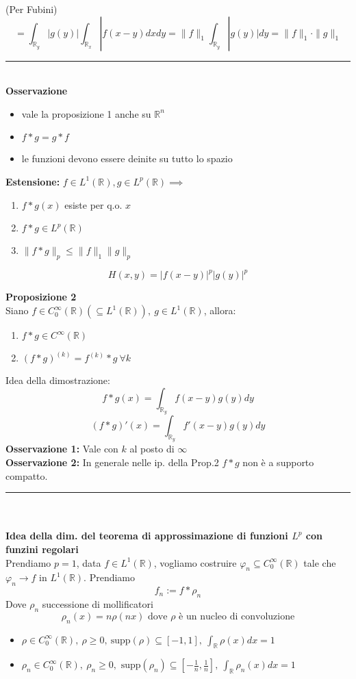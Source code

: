 \documentclass[a4paper]{article}
\newcommand{\R}{\mathbb{R}}
\newcommand{\divider}{\noindent\rule{\textwidth}{0.5pt}}
\begin{document}
(Per Fubini)
\[=\int_{\R_y}^{} |g(y)| \int_{\R_x}^{} |f(x-y)dxdy=\|f\|_1 \int_{\R_y}^{} |g(y)|dy=\|f\|_1\cdot \|g\|_1\]   
\divider\\
\textbf{Osservazione}
\begin{itemize}
	\item vale la proposizione 1 anche su $\R^n$ 
	\item $f* g=g * f$ 
	\item le funzioni devono essere deinite su tutto lo spazio
\end{itemize}
\textbf{Estensione:} $f\in L^{1}(\R),g\in L^{p}(\R)\implies$
\begin{enumerate}
	\item $f * g(x)$ esiste per q.o. $x$ 
	\item $f*g\in L^{p}(\R)$ 
	\item $\|f * g\|_p\le \|f\|_1 \|g\|_p$
\end{enumerate}
\[H(x,y)=|f(x-y)|^p|g(y)|^p\]
\begin{tcolorbox}
	\textbf{Proposizione 2} 
	\\Siano $f\in C_0^\infty(\R)(\subseteq  L^{1}(\R)),\ g\in L^{1}(\R)$, allora:
	\begin{enumerate}
		\item $f*g\in C^\infty(\R)$ 
		\item $(f*g)^{(k)}=f^{(k)}*g\ \forall k$
	\end{enumerate}
\end{tcolorbox}
Idea della dimostrazione: 
\[f * g(x)=\int_{\R_y}^{} f(x-y)g(y)dy\]
\[(f *g)'(x)=\int_{\R_y}^{} f'(x-y)g(y)dy\]
\textbf{Osservazione 1:} 
Vale con $k$ al posto di $\infty$\\
\textbf{Osservazione 2:} In generale nelle ip. della Prop.2 $f*g$ non è a supporto compatto. 
\\\divider\\
\\\textbf{Idea della dim. del teorema di approssimazione di funzioni $L ^p$ con funzini regolari}
\\Prendiamo $p=1$, data $f\in L^{1}(\R)$, vogliamo costruire $\varphi_n\subseteq  C_0^\infty(\R)$ tale che $\varphi_n\to f$ in $L^{1}(\R)$. Prendiamo
\[f_n:=f*\rho_n\]
Dove $\rho_n$ successione di mollificatori
\[\rho_n(x)=n\rho(nx) \text{ dove }\rho \text{ è un nucleo di convoluzione}\]
\begin{itemize}
	\item $\rho\in C_0^\infty(\R),\ \rho\ge 0,\ \text{supp}(\rho)\subseteq  [-1,1],\ \int_{\R}^{} \rho(x)dx=1$ 
	\item $\rho_n\in C^\infty_0(\R),\ \rho_n\ge 0,\text{ supp}(\rho_n)\subseteq [-\frac{1}{n},\frac{1}{n}],\ \int_{\R}^{} \rho_n(x)dx=1 $
\end{itemize}
\end{document}
